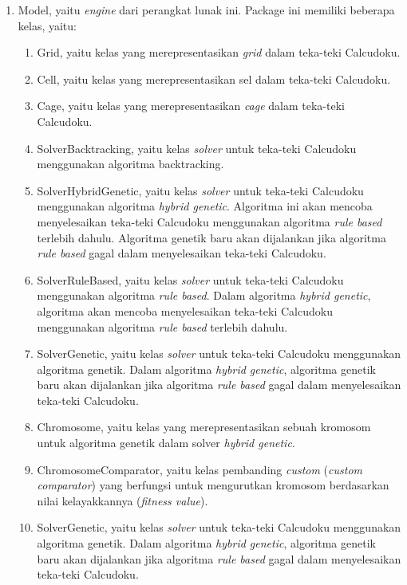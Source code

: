 \begin{enumerate}
\item Model, yaitu \textit{engine} dari perangkat lunak ini. Package ini memiliki beberapa kelas, yaitu:
	\begin{enumerate}
	\item Grid, yaitu kelas yang merepresentasikan \textit{grid} dalam teka-teki Calcudoku.
	\item Cell, yaitu kelas yang merepresentasikan sel dalam teka-teki Calcudoku.
	\item Cage, yaitu kelas yang merepresentasikan \textit{cage} dalam teka-teki Calcudoku.
	\item SolverBacktracking, yaitu kelas \textit{solver} untuk teka-teki Calcudoku menggunakan algoritma backtracking.
	\item SolverHybridGenetic, yaitu kelas \textit{solver} untuk teka-teki Calcudoku menggunakan algoritma \textit{hybrid genetic}. Algoritma ini akan mencoba menyelesaikan teka-teki Calcudoku menggunakan algoritma \textit{rule based} terlebih dahulu. Algoritma genetik baru akan dijalankan jika algoritma \textit{rule based} gagal dalam menyelesaikan teka-teki Calcudoku.
	\item SolverRuleBased, yaitu kelas \textit{solver} untuk teka-teki Calcudoku menggunakan algoritma \textit{rule based}. Dalam algoritma \textit{hybrid genetic}, algoritma akan mencoba menyelesaikan teka-teki Calcudoku menggunakan algoritma \textit{rule based} terlebih dahulu.
	\item SolverGenetic, yaitu kelas \textit{solver} untuk teka-teki Calcudoku menggunakan algoritma genetik. Dalam algoritma \textit{hybrid genetic}, algoritma genetik baru akan dijalankan jika algoritma \textit{rule based} gagal dalam menyelesaikan teka-teki Calcudoku.
	\item Chromosome, yaitu kelas yang merepresentasikan sebuah kromosom untuk algoritma genetik dalam solver \textit{hybrid genetic}.
	\item ChromosomeComparator, yaitu kelas pembanding \textit{custom} (\textit{custom comparator}) yang berfungsi untuk mengurutkan kromosom berdasarkan nilai kelayakkannya (\textit{fitness value}).	
	\item SolverGenetic, yaitu kelas \textit{solver} untuk teka-teki Calcudoku menggunakan algoritma genetik. Dalam algoritma \textit{hybrid genetic}, algoritma genetik baru akan dijalankan jika algoritma \textit{rule based} gagal dalam menyelesaikan teka-teki Calcudoku.
	\end{enumerate}

\end{enumerate}
